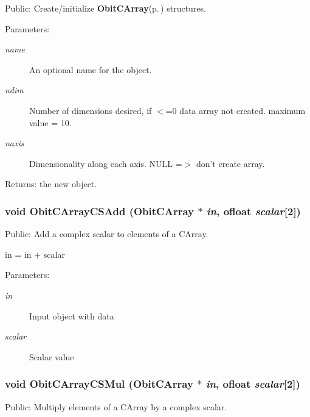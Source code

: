 Public: Create/initialize {\bf Obit\-CArray}{\rm (p.\,\pageref{structObitCArray})} structures. 

\begin{Desc}
\item[Parameters:]
\begin{description}
\item[{\em name}]An optional name for the object. \item[{\em ndim}]Number of dimensions desired, if $<$=0 data array not created. maximum value = 10. \item[{\em naxis}]Dimensionality along each axis. NULL =$>$ don't create array. \end{description}
\end{Desc}
\begin{Desc}
\item[Returns:]the new object. \end{Desc}
\subsubsection{\setlength{\rightskip}{0pt plus 5cm}void Obit\-CArray\-CSAdd ({\bf Obit\-CArray} $\ast$ {\em in}, {\bf ofloat} {\em scalar}[2])}\label{ObitCArray_8h_a50}


Public: Add a complex scalar to elements of a CArray. 

in = in + scalar \begin{Desc}
\item[Parameters:]
\begin{description}
\item[{\em in}]Input object with data \item[{\em scalar}]Scalar value \end{description}
\end{Desc}
\subsubsection{\setlength{\rightskip}{0pt plus 5cm}void Obit\-CArray\-CSMul ({\bf Obit\-CArray} $\ast$ {\em in}, {\bf ofloat} {\em scalar}[2])}\label{ObitCArray_8h_a51}


Public: Multiply elements of a CArray by a complex scalar. 

